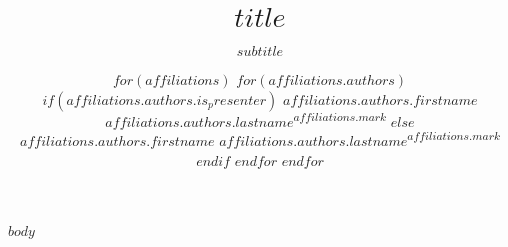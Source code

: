 \documentclass[%
	USenglish,  %
]{beamer}
\title[$short_title$]{$title$}
\subtitle{$subtitle$}
\author[%
$for(affiliations)$
$for(affiliations.authors)$
$if(affiliations.authors.is_presenter)$
$affiliations.authors.firstname$ \textsc{$affiliations.authors.lastname$}
$endif$
$endfor$
$endfor$
]{%
$for(affiliations)$
$for(affiliations.authors)$
$if(affiliations.authors.is_presenter)$
{\underline{$affiliations.authors.firstname$ \textsc{$affiliations.authors.lastname$}}\textsuperscript{$affiliations.mark$}}
$else$
{$affiliations.authors.firstname$ \textsc{$affiliations.authors.lastname$}\textsuperscript{$affiliations.mark$}}
$endif$
$endfor$
$endfor$
}
\institute[
$for(affiliations)$
$affiliations.name$$sep$,
$endfor$
]{
$for(affiliations)$
\textsuperscript{$affiliations.mark$}$affiliations.signature$ \\
$endfor$
}
\date[\talkdate]{\printdate{\talkdate}}
\begin{document}
\begin{frame}[plain]
	\titlepage
\end{frame}

$body$
\end{document}
